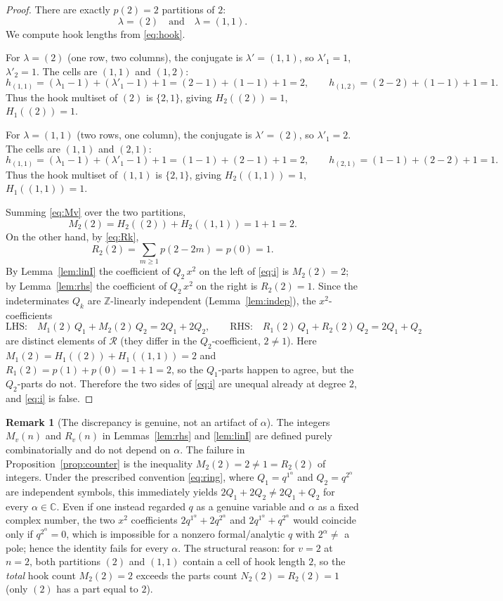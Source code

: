 \documentclass[12pt]{article}
\theoremstyle{definition}
\newtheorem{remark}{Remark}
\begin{document}
\begin{proof}
There are exactly $p(2)=2$ partitions of $2$:
\[
\lambda=(2)\quad\text{and}\quad\lambda=(1,1).
\]
We compute hook lengths from \eqref{eq:hook}.

For $\lambda=(2)$ (one row, two columns), the conjugate is $\lambda'=(1,1)$, so
$\lambda'_1=1$, $\lambda'_2=1$. The cells are $(1,1)$ and $(1,2)$:
\[
h_{(1,1)}=(\lambda_1-1)+(\lambda'_1-1)+1=(2-1)+(1-1)+1=2,\qquad
h_{(1,2)}=(2-2)+(1-1)+1=1.
\]
Thus the hook multiset of $(2)$ is $\{2,1\}$, giving $H_2((2))=1$, $H_1((2))=1$.

For $\lambda=(1,1)$ (two rows, one column), the conjugate is $\lambda'=(2)$, so
$\lambda'_1=2$. The cells are $(1,1)$ and $(2,1)$:
\[
h_{(1,1)}=(\lambda_1-1)+(\lambda'_1-1)+1=(1-1)+(2-1)+1=2,\qquad
h_{(2,1)}=(1-1)+(2-2)+1=1.
\]
Thus the hook multiset of $(1,1)$ is $\{2,1\}$, giving $H_2((1,1))=1$, $H_1((1,1))=1$.

Summing \eqref{eq:Mv} over the two partitions,
\[
M_2(2)=H_2((2))+H_2((1,1))=1+1=2.
\]
On the other hand, by \eqref{eq:Rk},
\[
R_2(2)=\sum_{m\ge1}p(2-2m)=p(0)=1.
\]
By Lemma~\ref{lem:linI} the coefficient of $Q_2\,x^2$ on the left of \eqref{eq:i} is
$M_2(2)=2$; by Lemma~\ref{lem:rhs} the coefficient of $Q_2\,x^2$ on the right is
$R_2(2)=1$. Since the indeterminates $Q_k$ are $\mathbb Z$-linearly independent
(Lemma~\ref{lem:indep}), the $x^2$-coefficients
\[
\text{LHS:}\quad M_1(2)\,Q_1+M_2(2)\,Q_2=2Q_1+2Q_2,
\qquad
\text{RHS:}\quad R_1(2)\,Q_1+R_2(2)\,Q_2=2Q_1+Q_2
\]
are distinct elements of $\mathcal R$ (they differ in the $Q_2$-coefficient,
$2\ne1$). Here $M_1(2)=H_1((2))+H_1((1,1))=2$ and
$R_1(2)=p(1)+p(0)=1+1=2$, so the $Q_1$-parts happen to agree, but the $Q_2$-parts do
not. Therefore the two sides of \eqref{eq:i} are unequal already at degree $2$, and
\eqref{eq:i} is false.
\end{proof}

\begin{remark}[The discrepancy is genuine, not an artifact of $\alpha$]\label{rem:alpha}
The integers $M_v(n)$ and $R_v(n)$ in Lemmas~\ref{lem:rhs} and \ref{lem:linI} are
defined purely combinatorially and do not depend on $\alpha$. The failure in
Proposition~\ref{prop:counter} is the inequality $M_2(2)=2\ne1=R_2(2)$ of integers.
Under the prescribed convention \eqref{eq:ring}, where $Q_1=q^{1^\alpha}$ and
$Q_2=q^{2^\alpha}$ are independent symbols, this immediately yields
$2Q_1+2Q_2\ne2Q_1+Q_2$ for every $\alpha\in\mathbb C$. Even if one instead regarded
$q$ as a genuine variable and $\alpha$ as a fixed complex number, the two $x^2$
coefficients $2q^{1^\alpha}+2q^{2^\alpha}$ and $2q^{1^\alpha}+q^{2^\alpha}$ would
coincide only if $q^{2^\alpha}=0$, which is impossible for a nonzero formal/analytic
$q$ with $2^\alpha\ne$ a pole; hence the identity fails for every $\alpha$. The
structural reason: for $v=2$ at $n=2$, both partitions $(2)$ and $(1,1)$ contain a
cell of hook length $2$, so the \emph{total} hook count $M_2(2)=2$ exceeds the
parts count $N_2(2)=R_2(2)=1$ (only $(2)$ has a part equal to $2$).
\end{remark}
\end{document}
